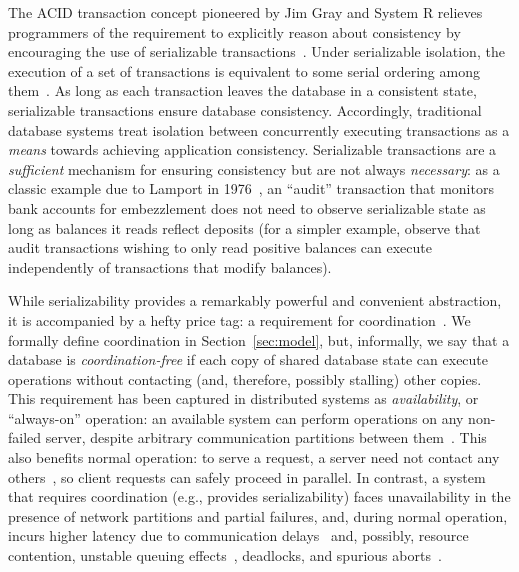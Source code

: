 
 The ACID transaction concept
pioneered by Jim Gray and System R relieves programmers of the
requirement to explicitly reason about consistency by encouraging the
use of serializable transactions~\cite{gray-virtues}. Under
serializable isolation, the execution of a set of transactions is
equivalent to some serial ordering among
them~\cite{bernstein-book}. As long as each transaction leaves the
database in a consistent state, serializable transactions ensure
database consistency. Accordingly, traditional database systems treat
isolation between concurrently executing transactions as a
\textit{means} towards achieving application consistency. Serializable
transactions are a \textit{sufficient} mechanism for ensuring
consistency but are not always \textit{necessary}: as a classic
example due to Lamport in 1976~\cite{lamport-audit}, an ``audit''
transaction that monitors bank accounts for embezzlement does not need
to observe serializable state as long as balances it reads reflect
deposits (for a simpler example, observe that audit transactions
wishing to only read positive balances can execute independently of
transactions that modify balances).


 While serializability provides a
remarkably powerful and convenient abstraction, it is accompanied by a
hefty price tag: a requirement for
coordination~\cite{davidson-survey}. We formally define coordination
in Section~\ref{sec:model}, but, informally, we say that a database is
\textit{coordination-free} if each copy of shared database state can
execute operations without contacting (and, therefore, possibly
stalling) other copies. This requirement has been captured in
distributed systems as \textit{availability}, or ``always-on''
operation: an available system can perform operations on any
non-failed server, despite arbitrary communication partitions between
them~\cite{gilbert-cap}. This also benefits normal operation: to serve
a request, a \cfree server need not contact any others~\cite{pacelc},
so client requests can safely proceed in parallel. In contrast, a
system that requires coordination (e.g., provides serializability)
faces unavailability in the presence of network partitions and partial
failures, and, during normal operation, incurs higher latency due to
communication delays~\cite{hat-vldb} and, possibly, resource
contention, unstable queuing effects~\cite{ladis}, deadlocks, and
spurious aborts~\cite{bernstein-book,gray-virtues}.

